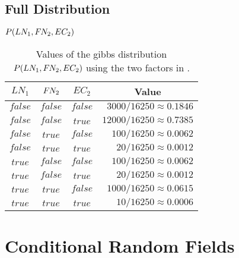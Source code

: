 \subsection{Full Distribution}\label{app:subsec-gd-full-distribution}
\begin{table}[H]
\centering
$P(LN_1,F\hspace{-0.07em} N_2,EC_2)$\par
\smallskip
\begin{tabular}{c c c r}
 \toprule
 $LN_1$ & $F\hspace{-0.07em} N_2$ & $EC_2$ & \multicolumn{1}{c}{Value} \\
 \midrule
 $\mathit{false}$ & $\mathit{false}$ & $\mathit{false}$ & $3000/16250\approx0.1846$\\
 $\mathit{false}$ & $\mathit{false}$ & $\mathit{true}$  & $12000/16250\approx0.7385$\\
 $\mathit{false}$ & $\mathit{true}$  & $\mathit{false}$ & $100/16250\approx0.0062$\\
 $\mathit{false}$ & $\mathit{true}$  & $\mathit{true}$  & $20/16250\approx0.0012$\\
 $\mathit{true}$  & $\mathit{false}$ & $\mathit{false}$ & $100/16250\approx0.0062$\\
 $\mathit{true}$  & $\mathit{false}$ & $\mathit{true}$  & $20/16250\approx0.0012$\\
 $\mathit{true}$  & $\mathit{true}$  & $\mathit{false}$ & $1000/16250\approx0.0615$\\
 $\mathit{true}$  & $\mathit{true}$  & $\mathit{true}$  & $10/16250\approx0.0006$\\
 \bottomrule
\end{tabular}
\caption{Values of the \Gls{gibbs distribution} $P(LN_1,F\hspace{-0.07em} N_2,EC_2)$ using the two \glspl{factor} in .}
\label{tab:example-factor-product}
\end{table}
\section{Conditional Random Fields}\label{app:sec-conditional-random-fields}
